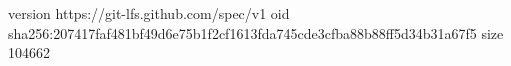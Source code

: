 version https://git-lfs.github.com/spec/v1
oid sha256:207417faf481bf49d6e75b1f2cf1613fda745cde3cfba88b88ff5d34b31a67f5
size 104662
